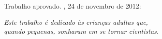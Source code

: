 \documentclass[
	12pt,				%
	openright,			%
	twoside,			%
	a4paper,			%
	english,			%
	french,				%
	spanish,			%
	brazil				%
	]{abntex2}
\begin{document}
%
% 
%
\begin{folhadeaprovacao}

  \begin{center}
    {\ABNTEXchapterfont\large\imprimirautor}

    \vspace*{\fill}\vspace*{\fill}
    \begin{center}
      \ABNTEXchapterfont\bfseries\Large\imprimirtitulo
    \end{center}
    \vspace*{\fill}
    
    \hspace{.45\textwidth}
    \begin{minipage}{.5\textwidth}
        \imprimirpreambulo
    \end{minipage}%
    \vspace*{\fill}
   \end{center}
        
   Trabalho aprovado. \imprimirlocal, 24 de novembro de 2012:

      
   \begin{center}
    \vspace*{0.5cm}
    {\large\imprimirlocal}
    \par
    {\large\imprimirdata}
    \vspace*{1cm}
  \end{center}
  
\end{folhadeaprovacao}

\begin{dedicatoria}
   \vspace*{\fill}
   \centering
   \noindent
   \textit{ Este trabalho é dedicado às crianças adultas que,\\
   quando pequenas, sonharam em se tornar cientistas.} \vspace*{\fill}
\end{dedicatoria}
\end{document}
